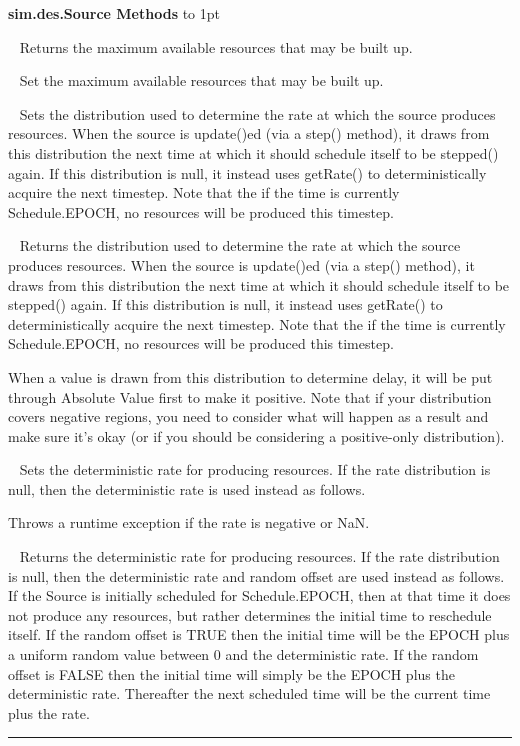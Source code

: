 \documentclass[twoside,10pt]{article}
\newcommand\class[1]{\index{Classes!{#1}}\textsf{#1}}
\newcommand*{\xfill}[1][0pt]{%
	\cleaders
		\hbox to 1pt{\hss
			\raisebox{#1}{\rule{1.2pt}{0.4pt}}%
			\hss}\hfill}
\newenvironment{methods}[1]{
\vspace{1.0em}\noindent\textsf{\textbf{#1 Methods}}\quad \xfill[0.5ex]
\vspace{-0.25em}
\begin{description}
\small}
{\end{description}\hrule\vspace{1.5em}}
\newcommand{\mthd}[1]{\item[{\sf #1}]~\newline}
\begin{document}
\begin{methods}{\class{sim.des.Source}}
\mthd{ public double getCapacity()}
Returns the maximum available resources that may be built up.

\mthd{public void setCapacity(double d)}
Set the maximum available resources that may be built up. 

\mthd{public void setRateDistribution(AbstractDistribution rateDistribution)}
Sets the distribution used to determine the rate at which the source produces resources.
        When the source is update()ed (via a step() method), it draws from this distribution the
        next time at which it should schedule itself to be stepped() again.  If this distribution
        is null, it instead uses getRate() to deterministically acquire the next timestep.  Note that
        the if the time is currently Schedule.EPOCH, no resources will be produced this timestep.  
        
\mthd{public AbstractDistribution getRateDistribution()}
Returns the distribution used to determine the rate at which the source produces resources.
        When the source is update()ed (via a step() method), it draws from this distribution the
        next time at which it should schedule itself to be stepped() again.  If this distribution
        is null, it instead uses getRate() to deterministically acquire the next timestep.  Note that
        the if the time is currently Schedule.EPOCH, no resources will be produced this timestep.  
        
        When a value is drawn from this distribution to determine
        delay, it will be put through Absolute Value first to make it positive.  Note that if your 
        distribution covers negative regions, you need to consider what will happen as a result and 
        make sure it's okay (or if you should be considering a positive-only distribution). 
        
\mthd{ public void setRate(double rate)}
Sets the deterministic rate for producing resources.  If the rate
        distribution is null, then the deterministic rate is used instead as follows.
        
     Throws a runtime exception if the rate is negative or NaN.
        
\mthd{ public double getRate()}
Returns the deterministic rate for producing resources.  If the rate
        distribution is null, then the deterministic rate and random offset are used instead as follows.
        If the Source is initially scheduled for Schedule.EPOCH, then at that time it does not produce
        any resources, but rather determines the initial time to reschedule itself.  If the random offset
        is TRUE then the initial time will be the EPOCH plus a uniform random value between 0 and the
        deterministic rate.  If the random offset is FALSE then the initial time will simply be the EPOCH plus
        the deterministic rate.  Thereafter the next scheduled time will be the current time plus the rate. 
        

\end{methods}
\end{document}
